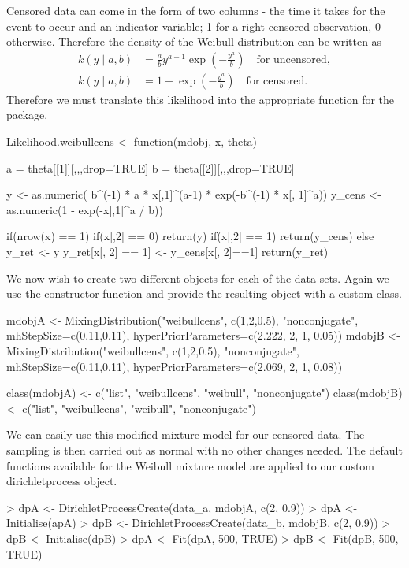 \documentclass[nojss]{jss}
\begin{document}
Censored data can come in the form of two columns - the time it takes for the event to occur and an indicator variable; 1 for a right censored observation, 0 otherwise. Therefore the density of the Weibull distribution can be written as
\begin{align*}
k(y \mid a , b) & = \frac{a}{b} y ^{a-1}  \exp \left( -  \frac{y^a}{b}  \right) \quad \text{for uncensored}, \\
k(y \mid a , b) & = 1 - \exp \left( -\frac{y^a}{b} \right) \quad \text{for censored}.
\end{align*}
Therefore we must translate this likelihood into the appropriate function for the  package.

\begin{CodeInput}
Likelihood.weibullcens <- function(mdobj, x, theta){
  a = theta[[1]][,,,drop=TRUE]
  b = theta[[2]][,,,drop=TRUE]

  y <- as.numeric(
  b^(-1) * a * x[,1]^(a-1) * exp(-b^(-1) * x[, 1]^a))
  y_cens <- as.numeric(1 - exp(-x[,1]^a / b))

  if(nrow(x) == 1){
    if(x[,2] == 0) return(y)
    if(x[,2] == 1) return(y_cens)
  }
  else{
    y_ret <- y
    y_ret[x[, 2] == 1] <- y_cens[x[, 2]==1]
    return(y_ret)
  }
}
\end{CodeInput}

We now wish to create two different  objects for each of the data sets. Again we use the  constructor function and provide the resulting object with a custom class.

\begin{CodeInput}
mdobjA <- MixingDistribution("weibullcens", c(1,2,0.5), "nonconjugate",
mhStepSize=c(0.11,0.11), hyperPriorParameters=c(2.222, 2, 1, 0.05))
mdobjB <- MixingDistribution("weibullcens", c(1,2,0.5), "nonconjugate",
mhStepSize=c(0.11,0.11), hyperPriorParameters=c(2.069, 2, 1, 0.08))

class(mdobjA) <- c("list", "weibullcens", "weibull", "nonconjugate")
class(mdobjB) <- c("list", "weibullcens", "weibull", "nonconjugate")
\end{CodeInput}

We can easily use this modified mixture model for our censored data. The sampling is then carried out as normal with no other changes needed. The default functions available for the Weibull mixture model are applied to our custom dirichletprocess object.
\begin{Schunk}
\begin{Sinput}
> dpA <- DirichletProcessCreate(data_a, mdobjA, c(2, 0.9))
> dpA <- Initialise(apA)
> dpB <- DirichletProcessCreate(data_b, mdobjB, c(2, 0.9))
> dpB <- Initialise(dpB)
> dpA <- Fit(dpA, 500, TRUE)
> dpB <- Fit(dpB, 500, TRUE)
\end{Sinput}
\end{Schunk}
\end{document}
